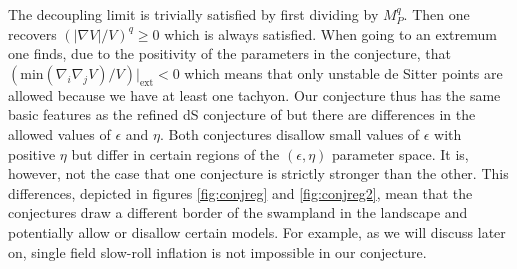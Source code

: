 \documentclass[12pt]{report}
\begin{document}
The decoupling limit is trivially satisfied by first dividing by $M_P^q$. Then one recovers $(|\nabla V|/V)^q \geq 0$ which is always satisfied. When going to an extremum one finds, due to the positivity of the parameters in the conjecture, that $(\text{min}(\nabla_i \nabla_j V)/V)|_{\text{ext}}<0$ which means that only unstable de Sitter points are allowed because we have at least one tachyon. Our conjecture thus has the same basic features as the refined dS conjecture of \cite{Ooguri:2018wrx} but there are differences in the allowed values of $\epsilon$ and $\eta$. Both conjectures disallow small values of $\epsilon$ with positive $\eta$ but differ in certain regions of the $(\epsilon,\eta)$ parameter space. It is, however, not the case that one conjecture is strictly stronger than the other. This differences, depicted in figures \ref{fig:conjreg} and \ref{fig:conjreg2}, mean that the conjectures draw a different border of the swampland in the landscape and potentially allow or disallow certain models. For example, as we will discuss later on, single field slow-roll inflation is not impossible in our conjecture.
\end{document}
